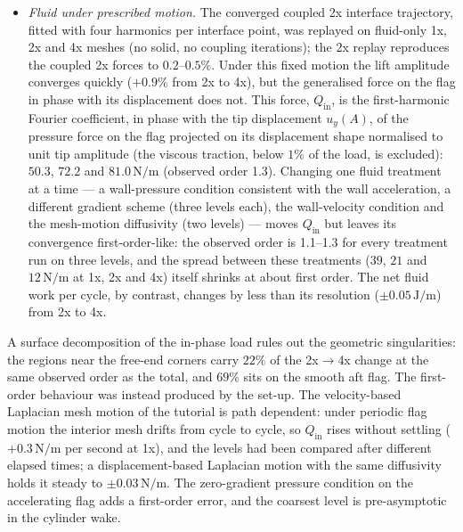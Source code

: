 \begin{itemize}
	\item \emph{Fluid under prescribed motion.} The converged coupled 2x interface trajectory, fitted with four harmonics per interface point, was replayed on fluid-only 1x, 2x and 4x meshes (no solid, no coupling iterations); the 2x replay reproduces the coupled 2x forces to $0.2$--$0.5\%$. Under this fixed motion the lift amplitude converges quickly ($+0.9\%$ from 2x to 4x), but the generalised force on the flag in phase with its displacement does not. This force, $Q_\mathrm{in}$, is the first-harmonic Fourier coefficient, in phase with the tip displacement $u_y(A)$, of the pressure force on the flag projected on its displacement shape normalised to unit tip amplitude (the viscous traction, below $1\%$ of the load, is excluded): $50.3$, $72.2$ and $81.0\,\mathrm{N/m}$ (observed order 1.3). Changing one fluid treatment at a time --- a wall-pressure condition consistent with the wall acceleration, a different gradient scheme (three levels each), the wall-velocity condition and the mesh-motion diffusivity (two levels) --- moves $Q_\mathrm{in}$ but leaves its convergence first-order-like: the observed order is 1.1--1.3 for every treatment run on three levels, and the spread between these treatments ($39$, $21$ and $12\,\mathrm{N/m}$ at 1x, 2x and 4x) itself shrinks at about first order. The net fluid work per cycle, by contrast, changes by less than its resolution ($\pm0.05\,\mathrm{J/m}$) from 2x to 4x.
\end{itemize}
A surface decomposition of the in-phase load rules out the geometric singularities: the regions near the free-end corners carry $22\%$ of the 2x$\to$4x change at the same observed order as the total, and $69\%$ sits on the smooth aft flag.
The first-order behaviour was instead produced by the set-up.
The velocity-based Laplacian mesh motion of the tutorial is path dependent: under periodic flag motion the interior mesh drifts from cycle to cycle, so $Q_\mathrm{in}$ rises without settling ($+0.3\,\mathrm{N/m}$ per second at 1x), and the levels had been compared after different elapsed times; a displacement-based Laplacian motion with the same diffusivity holds it steady to $\pm0.03\,\mathrm{N/m}$.
The zero-gradient pressure condition on the accelerating flag adds a first-order error, and the coarsest level is pre-asymptotic in the cylinder wake.
